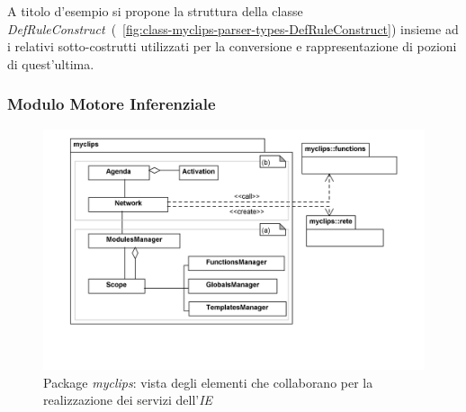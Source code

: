 


A titolo d'esempio si propone la struttura della classe \emph{DefRuleConstruct}~(\figurename~\ref{fig:class-myclips-parser-types-DefRuleConstruct})  insieme ad i relativi sotto-costrutti utilizzati per la conversione e rappresentazione di pozioni di quest'ultima.

\clearpage

\subsubsection{Modulo Motore Inferenziale}

\begin{figure}[h]
\centering
\includegraphics[width=1\textwidth]{Immagini/Capitolo3/Packages/IE.png}
\caption{Package \emph{myclips}: vista degli elementi che collaborano per la realizzazione dei servizi dell'\emph{IE}}\label{fig:packages-ie}
\end{figure}

